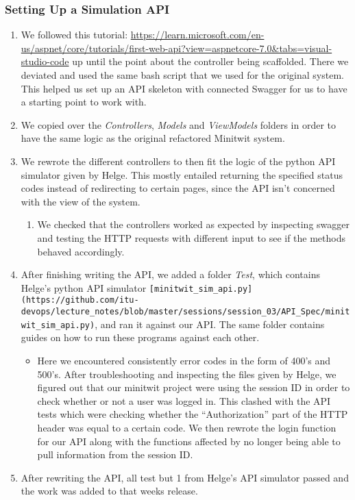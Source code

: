 \subsubsection{Setting Up a Simulation API}
\label{log:setting-up-a-simulation-api}

\begin{enumerate}
    \item We followed this tutorial: \url{https://learn.microsoft.com/en-us/aspnet/core/tutorials/first-web-api?view=aspnetcore-7.0\&tabs=visual-studio-code} up until the point about the controller being scaffolded. There we deviated and used the same bash script that we used for the original system. This helped us set up an API skeleton with connected Swagger for us to have a starting point to work with.
    \item We copied over the \emph{Controllers}, \emph{Models} and \emph{ViewModels} folders in order to have the same logic as the original refactored Minitwit system.
    \item We rewrote the different controllers to then fit the logic of the python API simulator given by Helge. This mostly entailed returning the specified status codes instead of redirecting to certain pages, since the API isn't concerned with the view of the system.

    \begin{enumerate}
        \item We checked that the controllers worked as expected by inspecting swagger and testing the HTTP requests with different input to see if the methods behaved accordingly.
    \end{enumerate}
    \item After finishing writing the API, we added a folder \emph{Test}, which contains Helge's python API simulator \texttt{{[}minitwit\_sim\_api.py{]}(https://github.com/itu-devops/lecture\_notes/blob/master/sessions/session\_03/API\_Spec/minitwit\_sim\_api.py)}, and ran it against our API. The same folder contains guides on how to run these programs against each other.

    \begin{itemize}
        \item Here we encountered consistently error codes in the form of 400's and 500's. After troubleshooting and inspecting the files given by Helge, we figured out that our minitwit project were using the session ID in order to check whether or not a user was logged in. This clashed with the API tests which were checking whether the ``Authorization'' part of the HTTP header was equal to a certain code. We then rewrote the login function for our API along with the functions affected by no longer being able to pull information from the session ID.
    \end{itemize}

    \item After rewriting the API, all test but 1 from Helge's API simulator passed and the work was added to that weeks release.
\end{enumerate}

